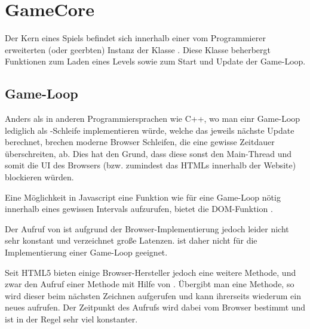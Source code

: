 \chapter{GameCore}

Der Kern eines Spiels befindet sich innerhalb einer vom Programmierer erweiterten (oder geerbten) Instanz der Klasse . Diese Klasse beherbergt Funktionen zum Laden eines Levels sowie zum Start und Update der Game-Loop.

\section{Game-Loop}

Anders als in anderen Programmiersprachen wie C++, wo man einr Game-Loop lediglich als -Schleife implementieren würde, welche das jeweils nächste Update berechnet, brechen moderne Browser Schleifen, die eine gewisse Zeitdauer überschreiten, ab. Dies hat den Grund, dass diese sonst den Main-Thread und somit die UI des Browsers (bzw. zumindest das HTMLs innerhalb der Website) blockieren würden.

Eine Möglichkeit in Javascript eine Funktion wie für eine Game-Loop nötig innerhalb eines gewissen Intervals aufzurufen, bietet die DOM-Funktion . 


Der Aufruf von  ist aufgrund der Browser-Implementierung jedoch leider nicht sehr konstant und verzeichnet große Latenzen.  ist daher nicht für die Implementierung einer Game-Loop geeignet.

Seit HTML5 bieten einige Browser-Hersteller jedoch eine weitere Methode, und zwar den Aufruf einer Methode mit Hilfe von . Übergibt man  eine Methode, so wird dieser beim nächsten Zeichnen aufgerufen und kann ihrerseits wiederum ein neues  aufrufen. Der Zeitpunkt des Aufrufs wird dabei vom Browser bestimmt und ist in der Regel sehr viel konstanter.

